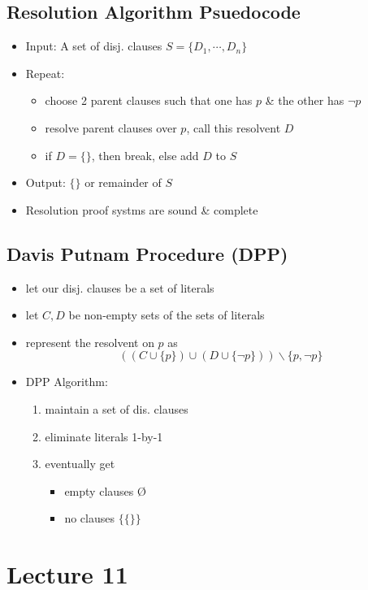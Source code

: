 \documentclass[11pt]{article}
\begin{document}
\subsection{Resolution Algorithm Psuedocode}
\begin{itemize}
    \item Input: A set of disj. clauses $S=\{D_1, \cdots, D_n\}$
    \item Repeat:
    \begin{itemize}
        \item choose 2 parent clauses such that one has $p$ \& the other has $\neg p$
        \item resolve parent clauses over $p$, call this resolvent $D$
        \item if $D=\{\}$, then break, else add $D$ to $S$
    \end{itemize}
    \item Output: $\{\}$ or remainder of $S$
    \item Resolution proof systms are sound \& complete 
\end{itemize}
\subsection{Davis Putnam Procedure (DPP)}
\begin{itemize}
    \item let our disj. clauses be a set of literals 
    \item let $C, D$ be non-empty sets of the sets of literals 
    \item represent the resolvent on $p$ as \[((C\cup\{p\})\cup(D\cup\{\neg p\}))\backslash \{p, \neg p\}\]
    \item DPP Algorithm: 
    \begin{enumerate}
        \item maintain a set of dis. clauses 
        \item eliminate literals 1-by-1
        \item eventually get 
        \begin{itemize}
            \item empty clauses \O 
            \item no clauses $\{\{\}\}$
        \end{itemize}
    \end{enumerate}
\end{itemize}

\section{Lecture 11}
\end{document}
